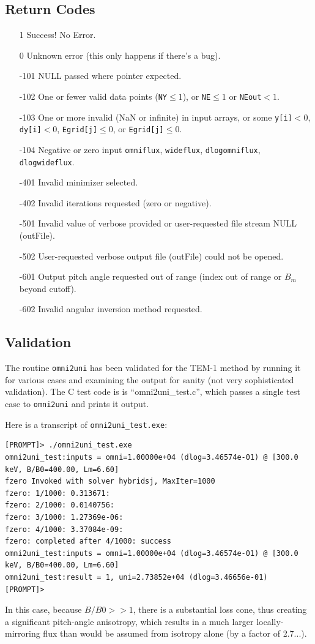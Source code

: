 \documentclass{article}    %
\begin{document}
\subsection{Return Codes}
\label{secTEM1retcodes}
\begin{itemize}
\item[1] Success! No Error.
\item[0] Unknown error (this only happens if there's a bug).
\item[-101] NULL passed where pointer expected.
\item[-102] One or fewer valid data points (\verb|NY|$ \le 1$), or \verb|NE|$\le 1$ or \verb|NEout|$<1$.
\item[-103] One or more invalid (NaN or infinite) in input arrays, or 
  some \verb|y[i]|$<0$, \verb|dy[i]|$<0$, \verb|Egrid[j]|$\le 0$, or \verb|Egrid[j]|$\le 0$.
\item[-104] Negative or zero input \verb|omniflux|, \verb|wideflux|, \verb|dlogomniflux|, \verb|dlogwideflux|.
\item[-401] Invalid minimizer selected.
\item[-402] Invalid iterations requested (zero or negative).
\item[-501] Invalid value of verbose provided or user-requested file stream NULL (outFile).
\item[-502] User-requested verbose output file (outFile) could not be opened.
\item[-601] Output pitch angle requested out of range (index out of range or $B_m$ beyond cutoff).
\item[-602] Invalid angular inversion method requested.
\end{itemize}

\subsection{Validation}

The routine \verb|omni2uni| has been validated for the TEM-1 method by
running it for various cases and examining the output for sanity (not
very sophisticated validation). The C test code is is
``omni2uni\_test.c'', which passes a single test case to
\verb|omni2uni| and prints it output.

Here is a transcript of \verb|omni2uni_test.exe|:
\begin{verbatim}
[PROMPT]> ./omni2uni_test.exe
omni2uni_test:inputs = omni=1.00000e+04 (dlog=3.46574e-01) @ [300.0 keV, B/B0=400.00, Lm=6.60]
fzero Invoked with solver hybridsj, MaxIter=1000
fzero: 1/1000: 0.313671:
fzero: 2/1000: 0.0140756:
fzero: 3/1000: 1.27369e-06:
fzero: 4/1000: 3.37084e-09:
fzero: completed after 4/1000: success
omni2uni_test:inputs = omni=1.00000e+04 (dlog=3.46574e-01) @ [300.0 keV, B/B0=400.00, Lm=6.60]
omni2uni_test:result = 1, uni=2.73852e+04 (dlog=3.46656e-01)
[PROMPT]> 
\end{verbatim}
In this case, because $B/B0>>1$, there is a substantial loss cone,
thus creating a significant pitch-angle anisotropy, which results in a
much larger locally-mirroring flux than would be assumed from isotropy
alone (by a factor of 2.7...).
\end{document}
